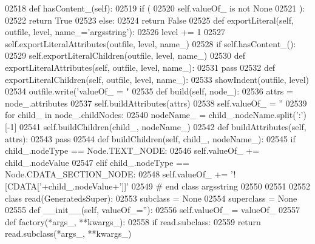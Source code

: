 \begin{DoxyCode}
{{{{{{{{{{{{{{{{{{{{{{{{{{{{{{{{{{{{{{{{{{{{{{{{{{{{{{{{{{{{{{{{{{{{{{{{{{{{{{{{{{{{{{{{{{{{{{{{{{{{{{{{{{{{{{{{{{{{{{{{{{{{{{{{{{{{{{{{{{{{{{{{{{{{{{{{{{{{{{{{{{{{{{{{{{{{{{{{{{{02518     \textcolor{keyword}{def }hasContent_(self):
02519         \textcolor{keywordflow}{if} (
02520             self.valueOf_ \textcolor{keywordflow}{is} \textcolor{keywordflow}{not} \textcolor{keywordtype}{None}
02521             ):
02522             \textcolor{keywordflow}{return} \textcolor{keyword}{True}
02523         \textcolor{keywordflow}{else}:
02524             \textcolor{keywordflow}{return} \textcolor{keyword}{False}
02525     \textcolor{keyword}{def }exportLiteral(self, outfile, level, name\_='argsstring'):
02526         level += 1
02527         self.exportLiteralAttributes(outfile, level, name\_)
02528         \textcolor{keywordflow}{if} self.hasContent_():
02529             self.exportLiteralChildren(outfile, level, name\_)
02530     \textcolor{keyword}{def }exportLiteralAttributes(self, outfile, level, name\_):
02531         \textcolor{keywordflow}{pass}
02532     \textcolor{keyword}{def }exportLiteralChildren(self, outfile, level, name\_):
02533         showIndent(outfile, level)
02534         outfile.write(\textcolor{stringliteral}{'valueOf\_ = "%
02535     \textcolor{keyword}{def }build(self, node\_):
02536         attrs = node\_.attributes
02537         self.buildAttributes(attrs)
02538         self.valueOf_ = \textcolor{stringliteral}{''}
02539         \textcolor{keywordflow}{for} child\_ \textcolor{keywordflow}{in} node\_.childNodes:
02540             nodeName\_ = child\_.nodeName.split(\textcolor{stringliteral}{':'})[-1]
02541             self.buildChildren(child\_, nodeName\_)
02542     \textcolor{keyword}{def }buildAttributes(self, attrs):
02543         \textcolor{keywordflow}{pass}
02544     \textcolor{keyword}{def }buildChildren(self, child\_, nodeName\_):
02545         \textcolor{keywordflow}{if} child\_.nodeType == Node.TEXT\_NODE:
02546             self.valueOf\_ += child\_.nodeValue
02547         \textcolor{keywordflow}{elif} child\_.nodeType == Node.CDATA\_SECTION\_NODE:
02548             self.valueOf\_ += \textcolor{stringliteral}{'![CDATA['}+child\_.nodeValue+\textcolor{stringliteral}{']]'}
02549 \textcolor{comment}{# end class argsstring}
02550 
02551 
02552 \textcolor{keyword}{class }read(GeneratedsSuper):
02553     subclass = \textcolor{keywordtype}{None}
02554     superclass = \textcolor{keywordtype}{None}
02555     \textcolor{keyword}{def }__init__(self, valueOf\_=''):
02556         self.valueOf_ = valueOf\_
02557     \textcolor{keyword}{def }factory(*args\_, **kwargs\_):
02558         \textcolor{keywordflow}{if} read.subclass:
02559             \textcolor{keywordflow}{return} read.subclass(*args\_, **kwargs\_)
}}}}}}}}}}}}}}}}}}}}}}}}}}}}}}}}}}}}}}}}}}}}}}}}}}}}}}}}}}}}}}}}}}}}}}}}}}}}}}}}}}}}}}}}}}}}}}}}}}}}}}}}}}}}}}}}}}}}}}}}}}}}}}}}}}}}}}}}}}}}}}}}}}}}}}}}}}}}}}}}}}}}}}}}}}}}}}}}}}}}
\end{DoxyCode}
